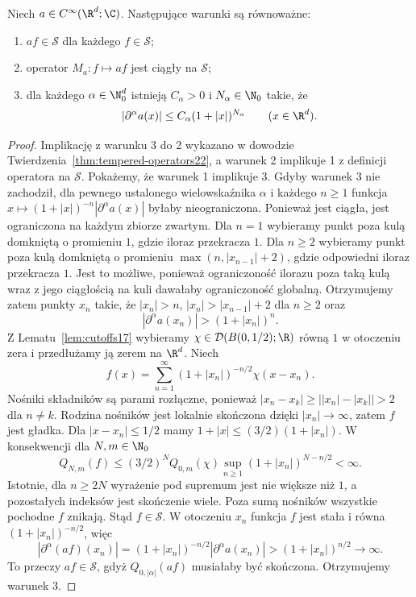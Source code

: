 \begin{twierdzenie}
\label{thm:dt-schwartz-multiplier-characterization}
Niech $a\in C^\infty(\R^d;\C)$. Następujące warunki
są równoważne:
\begin{enumerate}
\item $af\in\mathcal S$ dla każdego $f\in\mathcal S$;
\item operator $M_a:f\mapsto af$ jest ciągły na $\mathcal S$;
\item dla każdego $\alpha\in\N_0^d$ istnieją
$C_\alpha>0$ i $N_\alpha\in\N_0$ takie, że
\[
 |\partial^\alpha a(x)|\le C_\alpha(1+|x|)^{N_\alpha}
 \qquad(x\in\R^d).
\]
\end{enumerate}
\end{twierdzenie}
\begin{proof}
Implikację z warunku 3 do 2 wykazano w dowodzie
Twierdzenia~\ref{thm:tempered-operators22}, a warunek 2
implikuje 1 z definicji operatora na $\mathcal S$.
Pokażemy, że warunek 1 implikuje 3.
Gdyby warunek 3 nie zachodził, dla pewnego ustalonego
wielowskaźnika $\alpha$ i każdego $n\ge1$ funkcja
$x\mapsto (1+|x|)^{-n}|\partial^\alpha a(x)|$
byłaby nieograniczona. Ponieważ jest ciągła, jest
ograniczona na każdym zbiorze zwartym.
Dla $n=1$ wybieramy punkt poza kulą domkniętą
o promieniu $1$, gdzie iloraz przekracza $1$.
Dla $n\ge2$ wybieramy punkt poza kulą domkniętą
o promieniu $\max(n,|x_{n-1}|+2)$, gdzie odpowiedni
iloraz przekracza $1$. Jest to możliwe, ponieważ
ograniczoność ilorazu poza taką kulą wraz z jego
ciągłością na kuli dawałaby ograniczoność globalną.
Otrzymujemy zatem punkty $x_n$ takie, że
$|x_n|>n$, $|x_n|>|x_{n-1}|+2$ dla $n\ge2$ oraz
\[
 |\partial^\alpha a(x_n)|>(1+|x_n|)^n.
\]
Z Lematu~\ref{lem:cutoffs17} wybieramy
$\chi\in\mathcal D(B(0,1/2);\R)$ równą $1$ w otoczeniu zera
i przedłużamy ją zerem na $\R^d$.
Niech
\[
 f(x)=\sum_{n=1}^\infty
 (1+|x_n|)^{-n/2}\chi(x-x_n).
\]
Nośniki składników są parami rozłączne, ponieważ
$|x_n-x_k|\ge\bigl||x_n|-|x_k|\bigr|>2$ dla $n\ne k$.
Rodzina nośników jest lokalnie skończona dzięki
$|x_n|\to\infty$, zatem $f$ jest gładka.
Dla $|x-x_n|\le1/2$ mamy
$1+|x|\le(3/2)(1+|x_n|)$. W konsekwencji dla $N,m\in\N_0$
\[
 Q_{N,m}(f)\le (3/2)^N Q_{0,m}(\chi)
 \sup_{n\ge1}(1+|x_n|)^{N-n/2}<\infty.
\]
Istotnie, dla $n\ge2N$ wyrażenie pod supremum jest
nie większe niż $1$, a pozostałych indeksów jest
skończenie wiele. Poza sumą nośników wszystkie
pochodne $f$ znikają.
Stąd $f\in\mathcal S$. W otoczeniu $x_n$ funkcja $f$
jest stała i równa $(1+|x_n|)^{-n/2}$, więc
\[
 |\partial^\alpha(af)(x_n)|
 =(1+|x_n|)^{-n/2}|\partial^\alpha a(x_n)|
 >(1+|x_n|)^{n/2}\longrightarrow\infty.
\]
To przeczy $af\in\mathcal S$, gdyż $Q_{0,|\alpha|}(af)$
musiałaby być skończona. Otrzymujemy warunek 3.
\end{proof}


